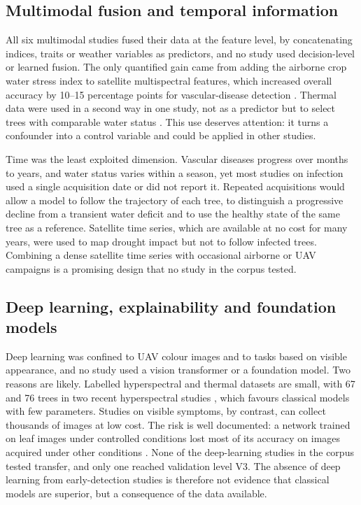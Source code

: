 \documentclass[preprint,12pt]{elsarticle}
\begin{document}
\subsection{Multimodal fusion and temporal information}\label{sec:disc_fusion}
All six multimodal studies fused their data at the feature level, by concatenating indices, traits or weather variables as predictors, and no study used decision-level or learned fusion. The only quantified gain came from adding the airborne crop water stress index to satellite multispectral features, which increased overall accuracy by 10--15 percentage points for vascular-disease detection \citep{u056}. Thermal data were used in a second way in one study, not as a predictor but to select trees with comparable water status \citep{u121}. This use deserves attention: it turns a confounder into a control variable and could be applied in other studies.

Time was the least exploited dimension. Vascular diseases progress over months to years, and water status varies within a season, yet most studies on infection used a single acquisition date or did not report it. Repeated acquisitions would allow a model to follow the trajectory of each tree, to distinguish a progressive decline from a transient water deficit and to use the healthy state of the same tree as a reference. Satellite time series, which are available at no cost for many years, were used to map drought impact \citep{u105,u138,u135} but not to follow infected trees. Combining a dense satellite time series with occasional airborne or UAV campaigns is a promising design that no study in the corpus tested.

\subsection{Deep learning, explainability and foundation models}\label{sec:disc_dl}
Deep learning was confined to UAV colour images and to tasks based on visible appearance, and no study used a vision transformer or a foundation model. Two reasons are likely. Labelled hyperspectral and thermal datasets are small, with 67 and 76 trees in two recent hyperspectral studies \citep{u054,u121}, which favours classical models with few parameters. Studies on visible symptoms, by contrast, can collect thousands of images at low cost. The risk is well documented: a network trained on leaf images under controlled conditions lost most of its accuracy on images acquired under other conditions \citep{Mohanty2016Using,Barbedo2018Factors}. None of the deep-learning studies in the corpus tested transfer, and only one reached validation level V3. The absence of deep learning from early-detection studies is therefore not evidence that classical models are superior, but a consequence of the data available.
\end{document}
